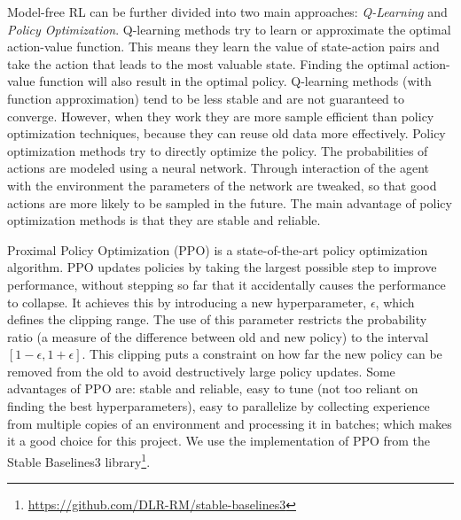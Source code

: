 \documentclass[a4paper]{article}
\begin{document}
Model-free RL can be further divided into two main approaches: \emph{Q-Learning} and \emph{Policy Optimization}.
Q-learning methods try to learn or approximate the optimal action-value function.
This means they learn the value of state-action pairs and take the action that leads to the most valuable state.
Finding the optimal action-value function will also result in the optimal policy.
Q-learning methods (with function approximation) tend to be less stable and are not guaranteed to converge.
However, when they work they are more sample efficient than policy optimization techniques, because they can reuse old data more effectively.
Policy optimization methods try to directly optimize the policy.
The probabilities of actions are modeled using a neural network.
Through interaction of the agent with the environment the parameters of the network are tweaked, so that good actions are more likely to be sampled in the future.
The main advantage of policy optimization methods is that they are stable and reliable.

Proximal Policy Optimization (PPO) \cite{schulman2017proximal} is a state-of-the-art policy optimization algorithm.
PPO updates policies by taking the largest possible step to improve performance, without stepping so far that it accidentally causes the performance to collapse.
It achieves this by introducing a new hyperparameter, $\epsilon$, which defines the clipping range.
The use of this parameter restricts the probability ratio (a measure of the difference between old and new policy) to the interval $[1-\epsilon,1+\epsilon]$.
This clipping puts a constraint on how far the new policy can be removed from the old to avoid destructively large policy updates.
Some advantages of PPO are: stable and reliable, easy to tune (not too reliant on finding the best hyperparameters), easy to parallelize by collecting experience from multiple copies of an environment and processing it in batches;
which makes it a good choice for this project.
We use the implementation of PPO from the Stable Baselines3 library\footnote{\url{https://github.com/DLR-RM/stable-baselines3}}.
\end{document}
